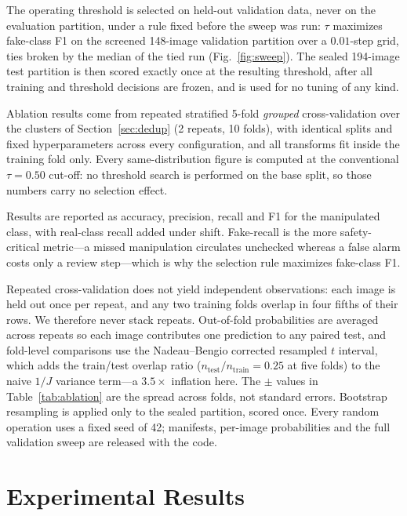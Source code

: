 \documentclass[conference,a4paper]{IEEEtran}
\begin{document}
The operating threshold is selected on held-out validation data, never on the
evaluation partition, under a rule fixed before the sweep was run: $\tau$
maximizes fake-class F1 on the screened 148-image validation partition over a
$0.01$-step grid, ties broken by the median of the tied run
(Fig.~\ref{fig:sweep}). The sealed 194-image test partition is then scored
exactly once at the resulting threshold, after all training and threshold
decisions are frozen, and is used for no tuning of any kind.

Ablation results come from repeated stratified 5-fold \emph{grouped}
cross-validation over the clusters of Section~\ref{sec:dedup} (2 repeats, 10
folds), with identical splits and fixed hyperparameters across every
configuration, and all transforms fit inside the training fold only. Every
same-distribution figure is computed at the conventional $\tau = 0.50$
cut-off: no threshold search is performed on the base split, so those numbers
carry no selection effect.

Results are reported as accuracy, precision, recall and F1 for the manipulated
class, with real-class recall added under shift. Fake-recall is the more
safety-critical metric---a missed manipulation circulates unchecked whereas a
false alarm costs only a review step---which is why the selection rule
maximizes fake-class F1.

Repeated cross-validation does not yield independent observations: each image
is held out once per repeat, and any two training folds overlap in four fifths
of their rows. We therefore never stack repeats. Out-of-fold probabilities are
averaged across repeats so each image contributes one prediction to any paired
test, and fold-level comparisons use the Nadeau--Bengio corrected resampled $t$
interval, which adds the train/test overlap ratio
($n_{\text{test}}/n_{\text{train}} = 0.25$ at five folds) to the naive $1/J$
variance term---a $3.5\times$ inflation here. The $\pm$ values in
Table~\ref{tab:ablation} are the spread across folds, not standard errors.
Bootstrap resampling is applied only to the sealed partition, scored once. Every random operation uses a fixed seed of 42;
manifests, per-image probabilities and the full validation sweep are released
with the code.

\section{Experimental Results}
\end{document}

